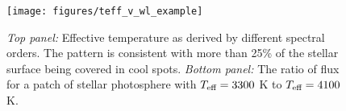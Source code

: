 \documentclass[11pt,aas_macros]{article}
\begin{document}
\begin{figure}[b]
	\centering
	\texttt{[image: figures/teff\_v\_wl\_example]} 
	\caption{\emph{Top panel:} Effective temperature as derived by different spectral orders.  The pattern is consistent with more than 25\% of the stellar surface being covered in cool spots.  \emph{Bottom panel:}  The ratio of flux for a patch of stellar photosphere with $T_\textrm{eff}=3300$ K to $T_\textrm{eff}=4100$ K. }
	\label{fig:teffOrder}
\end{figure}



\end{document}
